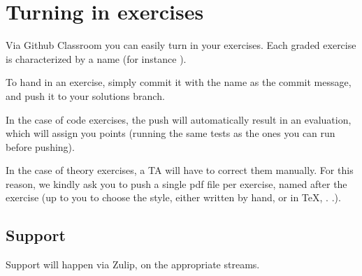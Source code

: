 
\section{Turning in exercises}\label{sec:handin_instructions}
Via Github Classroom you can easily turn in your exercises.
Each graded exercise is characterized by a name (for instance ).

To hand in an exercise, simply commit it with the name as the commit message, and push it to your solutions branch.

In the case of code exercises, the push will automatically result in an evaluation, which will assign you points (running the same tests as the ones you can run before pushing).

In the case of theory exercises, a TA will have to correct them manually.
For this reason, we kindly ask you to push a single pdf file per exercise, named after the exercise (up to you to choose the style, either written by hand, or in TeX, .
.).

\subsection{Support}
Support will happen via Zulip, on the appropriate streams.
